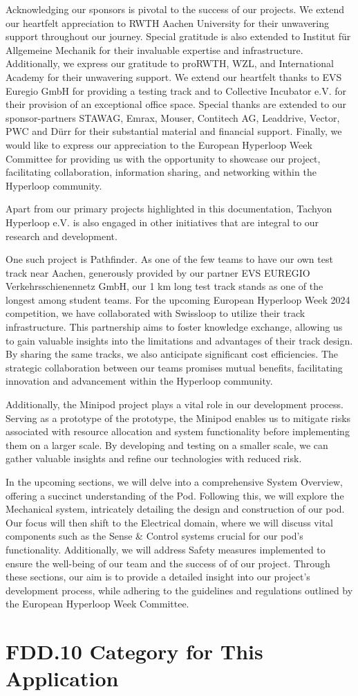 Acknowledging our sponsors is pivotal to the success of our projects. We extend our heartfelt appreciation to RWTH Aachen University for their unwavering support throughout our journey. Special gratitude is also extended to Institut für Allgemeine Mechanik for their invaluable expertise and infrastructure. Additionally, we express our gratitude to proRWTH, WZL, and International Academy for their unwavering support. We extend our heartfelt thanks to EVS Euregio GmbH for providing a testing track and to Collective Incubator e.V. for their provision of an exceptional office space. Special thanks are extended to our sponsor-partners STAWAG, Emrax, Mouser, Contitech AG, Leaddrive, Vector, PWC and Dürr  for their substantial material and financial support. Finally, we would like to express our appreciation to the European Hyperloop Week Committee for providing us with the opportunity to showcase our project, facilitating collaboration, information sharing, and networking within the Hyperloop community.

Apart from our primary projects highlighted in this documentation, Tachyon Hyperloop e.V. is also engaged in other initiatives that are integral to our research and development.

One such project is Pathfinder. As one of the few teams to have our own test track near Aachen, generously provided by our partner EVS EUREGIO Verkehrsschienennetz GmbH, our 1 km long test track stands as one of the longest among student teams. For the upcoming European Hyperloop Week 2024 competition, we have collaborated with Swissloop to utilize their track infrastructure. This partnership aims to foster knowledge exchange, allowing us to gain valuable insights into the limitations and advantages of their track design. By sharing the same tracks, we also anticipate significant cost efficiencies. The strategic collaboration between our teams promises mutual benefits, facilitating innovation and advancement within the Hyperloop community.

Additionally, the Minipod project plays a vital role in our development process. Serving as a prototype of the prototype, the Minipod enables us to mitigate risks associated with resource allocation and system functionality before implementing them on a larger scale. By developing and testing on a smaller scale, we can gather valuable insights and refine our technologies with reduced risk.

In the upcoming sections, we will delve into a comprehensive System Overview, offering a succinct understanding of the Pod. Following this, we will explore the Mechanical system, intricately detailing the design and construction of our pod. Our focus will then shift to the Electrical domain, where we will discuss vital components such as the Sense \& Control systems crucial for our pod's functionality. Additionally, we will address Safety measures implemented to ensure the well-being of our team and the success of of our project. Through these sections, our aim is to provide a detailed insight into our project's development process, while adhering to the guidelines and regulations outlined by the European Hyperloop Week Committee.

\section{FDD.10 Category for This Application}